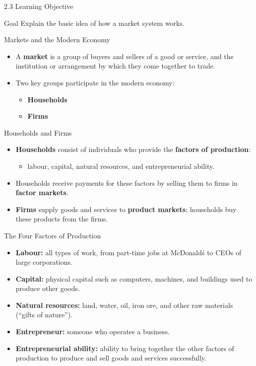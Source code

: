 \documentclass[aspectratio=169]{beamer}
\begin{document}
\begin{frame}{2.3 Learning Objective}
\transfade
\begin{block}{Goal}
Explain the basic idea of how a market system works.
\end{block}
\end{frame}

\begin{frame}{Markets and the Modern Economy}
\transfade
\begin{itemize}[<+->]
  \item A \textbf{market} is a group of buyers and sellers of a good or service, and the institution or arrangement by which they come together to trade.
  \item Two key groups participate in the modern economy:
  \begin{itemize}[<+->]
    \item \textbf{Households}
    \item \textbf{Firms}
  \end{itemize}
\end{itemize}
\end{frame}

\begin{frame}{Households and Firms}
\transfade
\begin{itemize}[<+->]
  \item \textbf{Households} consist of individuals who provide the \textbf{factors of production}:
  \begin{itemize}[<+->]
    \item labour, capital, natural resources, and entrepreneurial ability.
  \end{itemize}
  \item Households receive payments for these factors by selling them to firms in \textbf{factor markets}.
  \item \textbf{Firms} supply goods and services to \textbf{product markets}; households buy these products from the firms.
\end{itemize}
\end{frame}

\begin{frame}{The Four Factors of Production}
\transfade
\begin{itemize}[<+->]
  \item \textbf{Labour:} all types of work, from part-time jobs at McDonald\'s to CEOs of large corporations.
  \item \textbf{Capital:} physical capital such as computers, machines, and buildings used to produce other goods.
  \item \textbf{Natural resources:} land, water, oil, iron ore, and other raw materials (``gifts of nature'').
  \item \textbf{Entrepreneur:} someone who operates a business.
  \item \textbf{Entrepreneurial ability:} ability to bring together the other factors of production to produce and sell goods and services successfully.
\end{itemize}
\end{frame}
\end{document}
